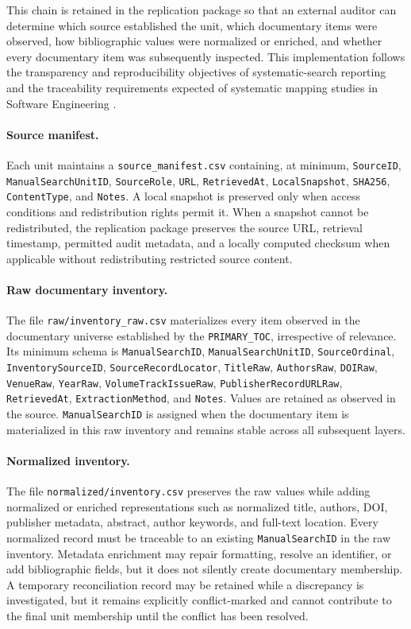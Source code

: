 This chain is retained in the replication package so that an external auditor can determine
which source established the unit, which documentary items were observed, how bibliographic
values were normalized or enriched, and whether every documentary item was subsequently inspected.
This implementation follows the transparency and reproducibility objectives of systematic-search
reporting \cite{Rethlefsen2021PRISMAS} and the traceability requirements expected of systematic
mapping studies in Software Engineering \cite{Petersen2015Mapping}.

\paragraph{Source manifest.}
Each unit maintains a \texttt{source\_manifest.csv} containing, at minimum,
\texttt{SourceID}, \texttt{ManualSearchUnitID}, \texttt{SourceRole}, \texttt{URL},
\texttt{RetrievedAt}, \texttt{LocalSnapshot}, \texttt{SHA256}, \texttt{ContentType}, and
\texttt{Notes}. A local snapshot is preserved only when access conditions and redistribution
rights permit it. When a snapshot cannot be redistributed, the replication package preserves the
source URL, retrieval timestamp, permitted audit metadata, and a locally computed checksum when
applicable without redistributing restricted source content.

\paragraph{Raw documentary inventory.}
The file \texttt{raw/inventory\_raw.csv} materializes every item observed in the documentary
universe established by the \texttt{PRIMARY\_TOC}, irrespective of relevance. Its minimum schema is
\texttt{ManualSearchID}, \texttt{ManualSearchUnitID}, \texttt{SourceOrdinal},
\texttt{InventorySourceID}, \texttt{SourceRecordLocator}, \texttt{TitleRaw},
\texttt{AuthorsRaw}, \texttt{DOIRaw}, \texttt{VenueRaw}, \texttt{YearRaw},
\texttt{VolumeTrackIssueRaw}, \texttt{PublisherRecordURLRaw}, \texttt{RetrievedAt},
\texttt{ExtractionMethod}, and \texttt{Notes}. Values are retained as observed in the source.
\texttt{ManualSearchID} is assigned when the documentary item is materialized in this raw inventory
and remains stable across all subsequent layers.

\paragraph{Normalized inventory.}
The file \texttt{normalized/inventory.csv} preserves the raw values while adding normalized or
enriched representations such as normalized title, authors, DOI, publisher metadata, abstract,
author keywords, and full-text location. Every normalized record must be traceable to an existing
\texttt{ManualSearchID} in the raw inventory. Metadata enrichment may repair formatting, resolve an
identifier, or add bibliographic fields, but it does not silently create documentary membership.
A temporary reconciliation record may be retained while a discrepancy is investigated, but it
remains explicitly conflict-marked and cannot contribute to the final unit membership until the
conflict has been resolved.

